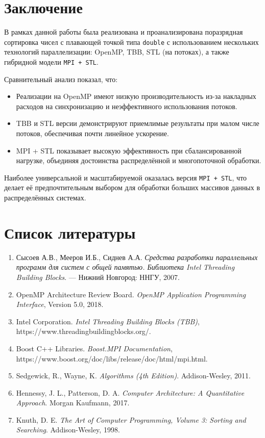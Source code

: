 \documentclass[12pt]{article}
\begin{document}
\newpage

\section{Заключение}

В рамках данной работы была реализована и проанализирована поразрядная сортировка чисел с плавающей точкой типа \texttt{double} с использованием нескольких технологий параллелизации: OpenMP, TBB, STL (на потоках), а также гибридной модели \texttt{MPI + STL}.

Сравнительный анализ показал, что:
\begin{itemize}
  \item Реализации на OpenMP имеют низкую производительность из-за накладных расходов на синхронизацию и неэффективного использования потоков.
  \item TBB и STL версии демонстрируют приемлимые результаты при малом числе потоков, обеспечивая почти линейное ускорение.
  \item MPI + STL показывает высокую эффективность при сбалансированной нагрузке, объединяя достоинства распределённой и многопоточной обработки.
\end{itemize}

Наиболее универсальной и масштабируемой оказалась версия \texttt{MPI + STL}, что делает её предпочтительным выбором для обработки больших массивов данных в распределённых системах.

\newpage

\section{Список литературы}

\begin{enumerate}
  \item Сысоев А.В., Мееров И.Б., Сиднев А.А. \textit{Средства разработки параллельных программ для систем с общей памятью. Библиотека Intel Threading Building Blocks}. — Нижний Новгород: ННГУ, 2007.
  \item OpenMP Architecture Review Board. \textit{OpenMP Application Programming Interface}, Version 5.0, 2018.
  \item Intel Corporation. \textit{Intel Threading Building Blocks (TBB)}, https://www.threadingbuildingblocks.org/.
  \item Boost C++ Libraries. \textit{Boost.MPI Documentation}, https://www.boost.org/doc/libs/release/doc/html/mpi.html.
  \item Sedgewick, R., Wayne, K. \textit{Algorithms (4th Edition)}. Addison-Wesley, 2011.
  \item Hennessy, J. L., Patterson, D. A. \textit{Computer Architecture: A Quantitative Approach}. Morgan Kaufmann, 2017.
  \item Knuth, D. E. \textit{The Art of Computer Programming, Volume 3: Sorting and Searching}. Addison-Wesley, 1998.
\end{enumerate}
\end{document}
